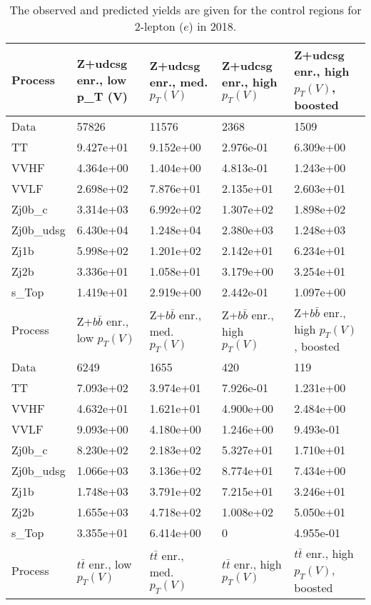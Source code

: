 \begin{table}
\centering
\caption[2018 2-lepton ($e$) control region yields]{
                  The observed and predicted yields are given for the
                  control regions for 2-lepton ($e$) in 2018.
                  }
{\footnotesize
\begin{tabularx}{\textwidth}{|X|X|X|X|X|}
\hline
Process & Z+udcsg enr., low p_{T} (V) & Z+udcsg enr., med. $p_{T}(V)$ & Z+udcsg enr., high $p_{T}(V)$ & Z+udcsg enr., high $p_{T}(V)$, boosted \\
\hline
Data & 57826 & 11576 & 2368 & 1509 \\
\hline
TT & 9.427e+01 & 9.152e+00 & 2.976e-01 & 6.309e+00 \\
VVHF & 4.364e+00 & 1.404e+00 & 4.813e-01 & 1.243e+00 \\
VVLF & 2.698e+02 & 7.876e+01 & 2.135e+01 & 2.603e+01 \\
Zj0b\_c & 3.314e+03 & 6.992e+02 & 1.307e+02 & 1.898e+02 \\
Zj0b\_udsg & 6.430e+04 & 1.248e+04 & 2.380e+03 & 1.248e+03 \\
Zj1b & 5.998e+02 & 1.201e+02 & 2.142e+01 & 6.234e+01 \\
Zj2b & 3.336e+01 & 1.058e+01 & 3.179e+00 & 3.254e+01 \\
s\_Top & 1.419e+01 & 2.919e+00 & 2.442e-01 & 1.097e+00 \\
\hline
\hline
Process & Z+$b\bar{b}$ enr., low $p_{T}(V)$ & Z+$b\bar{b}$ enr., med. $p_{T}(V)$ & Z+$b\bar{b}$ enr., high $p_{T}(V)$ & Z+$b\bar{b}$ enr., high $p_{T}(V)$, boosted \\
\hline
Data & 6249 & 1655 & 420 & 119 \\
\hline
TT & 7.093e+02 & 3.974e+01 & 7.926e-01 & 1.231e+00 \\
VVHF & 4.632e+01 & 1.621e+01 & 4.900e+00 & 2.484e+00 \\
VVLF & 9.093e+00 & 4.180e+00 & 1.246e+00 & 9.493e-01 \\
Zj0b\_c & 8.230e+02 & 2.183e+02 & 5.327e+01 & 1.710e+01 \\
Zj0b\_udsg & 1.066e+03 & 3.136e+02 & 8.774e+01 & 7.434e+00 \\
Zj1b & 1.748e+03 & 3.791e+02 & 7.215e+01 & 3.246e+01 \\
Zj2b & 1.655e+03 & 4.718e+02 & 1.008e+02 & 5.050e+01 \\
s\_Top & 3.355e+01 & 6.414e+00 & 0 & 4.955e-01 \\
\hline
\hline
Process & $t\bar{t}$ enr., low $p_{T}(V)$ & $t\bar{t}$ enr., med. $p_{T}(V)$ & $t\bar{t}$ enr., high $p_{T}(V)$ & $t\bar{t}$ enr., high $p_{T}(V)$, boosted \\

\end{tabularx}}
\end{table}
